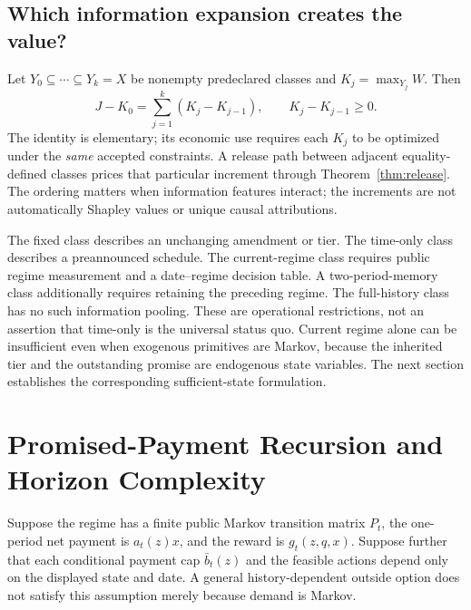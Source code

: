 \documentclass[11pt,letterpaper]{article}
\theoremstyle{definition}\newtheorem{assumption}[theorem]{Assumption}
\begin{document}
\subsection{Which information expansion creates the value?}
Let $Y_0\subseteq\cdots\subseteq Y_k=X$ be nonempty predeclared classes and $K_j=\max_{Y_j}W$. Then
\begin{equation}\label{eq:hierarchy}
 J-K_0=\sum_{j=1}^k(K_j-K_{j-1}),\qquad K_j-K_{j-1}\geq0.
\end{equation}
The identity is elementary; its economic use requires each $K_j$ to be optimized under the \emph{same} accepted constraints. A release path between adjacent equality-defined classes prices that particular increment through Theorem~\ref{thm:release}. The ordering matters when information features interact; the increments are not automatically Shapley values or unique causal attributions.

The fixed class describes an unchanging amendment or tier. The time-only class describes a preannounced schedule. The current-regime class requires public regime measurement and a date--regime decision table. A two-period-memory class additionally requires retaining the preceding regime. The full-history class has no such information pooling. These are operational restrictions, not an assertion that time-only is the universal status quo. Current regime alone can be insufficient even when exogenous primitives are Markov, because the inherited tier and the outstanding promise are endogenous state variables. The next section establishes the corresponding sufficient-state formulation.

\section{Promised-Payment Recursion and Horizon Complexity}\label{sec:recursion}
Suppose the regime has a finite public Markov transition matrix $P_t$, the one-period net payment is $a_t(z)x$, and the reward is $g_t(z,q,x)$. Suppose further that each conditional payment cap $\bar b_t(z)$ and the feasible actions depend only on the displayed state and date. A general history-dependent outside option does not satisfy this assumption merely because demand is Markov.
\end{document}
